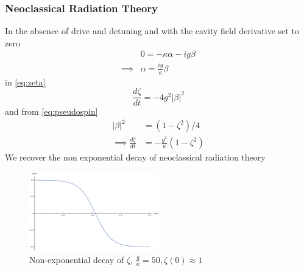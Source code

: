 \subsubsection{Neoclassical Radiation Theory}
In the absence of drive and detuning and with the cavity field derivative set to zero 
\begin{align}
	& 0 = -\kappa \alpha - ig \beta \\
	\implies & \alpha = \frac{ig}{\kappa} \beta
\end{align}
in \cref{eq:zeta} 
\begin{equation}
	\frac{d \zeta}{dt} = -4 g^2 |\beta|^2
\end{equation}
and from \cref{eq:pseudospin}
\begin{align}
	 |\beta|^2 &= (1-\zeta^2)/4 \\
\implies \frac{d \zeta}{dt} &= -\frac{g^2}{\kappa} (1-\zeta^2)
\end{align}
We recover the non exponential decay of neoclassical radiation theory
\begin{figure}
 	\centering
 	\includegraphics[width=0.5\textwidth]{Images/NeoclassicalDecay.png}
 	\caption{Non-exponential decay of $\zeta$, $\frac{g}{\kappa} = 50, \zeta(0) \approx 1$} \label{fig:neoclassical}
\end{figure}
